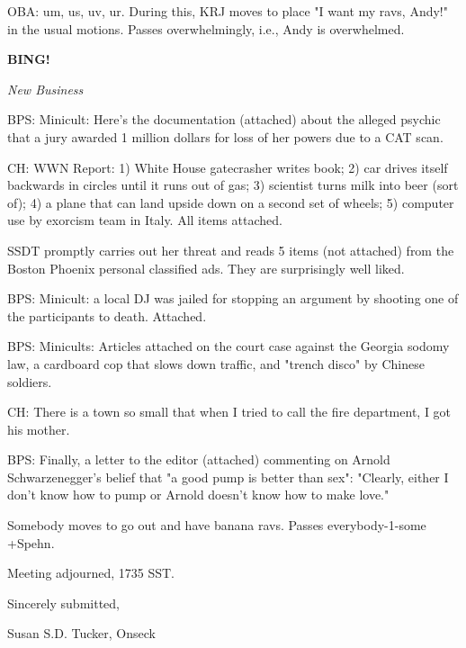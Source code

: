 \documentclass[12pt]{article}
\newcommand{\bing}{{\bf BING!} }
\newcommand{\goto}[1]{\bing \vskip 12pt \centerline{{\em{#1}}}}
\begin{document}
OBA: um, us, uv, ur. During this, KRJ moves to place "I want my ravs, Andy!" in the usual motions. Passes overwhelmingly, i.e., Andy is overwhelmed.

\goto{New Business}

BPS: Minicult: Here's the documentation (attached) about the alleged psychic that a jury awarded 1 million dollars for loss of her powers due to a CAT scan.

CH: WWN Report: 1) White House gatecrasher writes book; 2) car drives itself backwards in circles until it runs out of gas; 3) scientist turns milk into beer (sort of); 4) a plane that can land upside down on a second set of wheels; 5) computer use by exorcism team in Italy. All items attached.

SSDT promptly carries out her threat and reads 5 items (not attached) from the Boston Phoenix personal classified ads. They are surprisingly well liked.

BPS: Minicult: a local DJ was jailed for stopping an argument by shooting one of the participants to death. Attached.

BPS: Minicults: Articles attached on the court case against the Georgia sodomy law, a cardboard cop that slows down traffic, and "trench disco" by Chinese soldiers.

CH: There is a town so small that when I tried to call the fire department, I got his mother.

BPS: Finally, a letter to the editor (attached) commenting on Arnold Schwarzenegger's belief that "a good pump is better than sex": "Clearly, either I don't know how to pump or Arnold doesn't know how to make love."

Somebody moves to go out and have banana ravs. Passes everybody-1-some +Spehn.

\vspace{12pt}

\noindent
Meeting adjourned, 1735 SST.

\vspace{18pt}

\centerline{Sincerely submitted,}
\centerline{Susan S.D. Tucker, Onseck}
\end{document}

